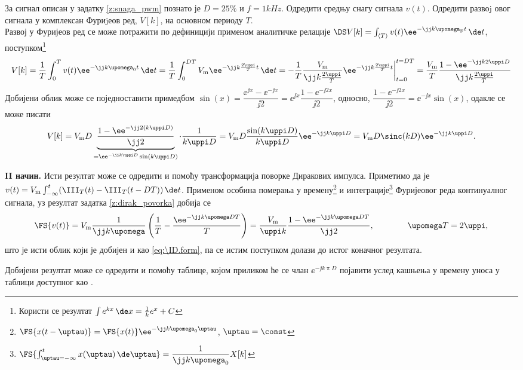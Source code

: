 \PID \label{z:rect_povorka}
За сигнал описан у задатку \ref{z:snaga_pwm} познато је 
$D = 25\%$ и $f = 1\unit{kHz}$. Одредити средњу снагу сигнала $v(t)$.
Одредити развоj овог сигнала у комплексан Фуриjеов ред, $V[k]$, на основном периоду $T$.
\\[2mm]

\RESENJE  Развој у Фуријеов ред се може потражити по дефиницији применом 
аналитичке релације 
$\DS V[k] = \int_{\langle T \rangle} v(t) \ee^{-\jj k \upomega_{\rm F} t} \, \de t$, 
поступком\footnote{Користи се резултат $\int e^{kx} \, \de x = \frac{1}{k} e^x + C$}
\begin{align}
    V[k] = \dfrac{1}{T} \int_{0}^T v(t) \ee^{-\jj k \upomega_{\rm 0} t} \, \de t 
         = \dfrac{1}{T} \int_{0}^{DT}  V_{\rm m} \ee^{-\jj k \frac{2\uppi}{T} t} \, \de t
         = - \dfrac{1}{T} \dfrac{V_{\rm m}}{\jj k \frac{2\uppi}{T}} 
         \ee^{-\jj k \frac{2\uppi}{T} t}\bigg|_{t = 0}^{t = DT}
         = \dfrac{V_{\rm m}}{T} \dfrac{
            1
            -
            \ee^{-\jj k 2\uppi D}
         }{\jj k \frac{2\uppi}{T}} 
\end{align}
Добијени облик може се поједноставити примедбом 
$\sin(x) = \dfrac{\ee^{\jj x} - \ee^{-\jj x}}{\jj 2} = \ee^{\jj x} \dfrac{1 - \ee^{-\jj 2x}}{\jj 2}$,
односно, 
$\dfrac{1 - \ee^{-\jj 2x}}{\jj 2} = \ee^{-\jj x} \sin(x) $,
одакле се може писати
\begin{align}
    V[k] = V_{\rm m}D 
     \underbrace{
     \dfrac{
        1
        -
        \ee^{-\jj 2 (k \uppi D) }
     }{\jj 2 }}_{ = \ee^{-\jj k \uppi D} \sin(k\uppi D) }
     \cdot 
     \dfrac{1}{k \uppi D} 
     = V_{\rm m} D \dfrac{\sin(k\uppi D)}{k\uppi D} \ee^{-\jj k \uppi D} 
     = V_{\rm m} D \sinc(k D) \ee^{-\jj k \uppi D}. \label{eq:\ID.form}
\end{align}

\textbf{II начин.} Исти резултат може  се одредити и помоћу трансформација поворке Диракових импулса. 
Приметимо да је $v(t) = V_{\rm m} \int_{-\infty}^t (\III_T(t) - \III_T(t - DT))\, \de t$. Применом особина 
померања у времену\footnote{
   $\FS{x(t-\uptau)} = \FS{x(t)} \ee^{-\jj k \upomega_{\rm 0} \uptau}$, $\uptau = \const$
}
и интеграције\footnote{
   $\FS{ \int_{\uptau = -\infty}^t x(\uptau) \, \de \uptau } = \dfrac{1}{\jj k \upomega_0} X[k]$ 
} Фуријеовог реда континуалног сигнала, уз резултат задатка \ref{z:dirak_povorka} добија се 
\begin{equation}
   \FS{v(t)} = V_{\rm m} \dfrac{1}{\jj k \upomega }  \left( \dfrac{1}{T} - \dfrac{\ee^{-\jj k \upomega D T}}{T} \right)
             = \dfrac{V_{\rm m}}{\uppi k} \dfrac{1 - \ee^{-\jj k \upomega D T}}{\jj 2}, \qquad \qquad \upomega T = 2\uppi,
\end{equation}
што је исти облик који је добијен и као \eqref{eq:\ID.form}, па се истим поступком долази до истог коначног резултата.

Добијени резултат може се одредити и помоћу таблице, којом приликом ће се члан 
$\ee^{-\jj k \uppi D}$ појавити услед кашњења у времену уноса у таблици доступног као . 
